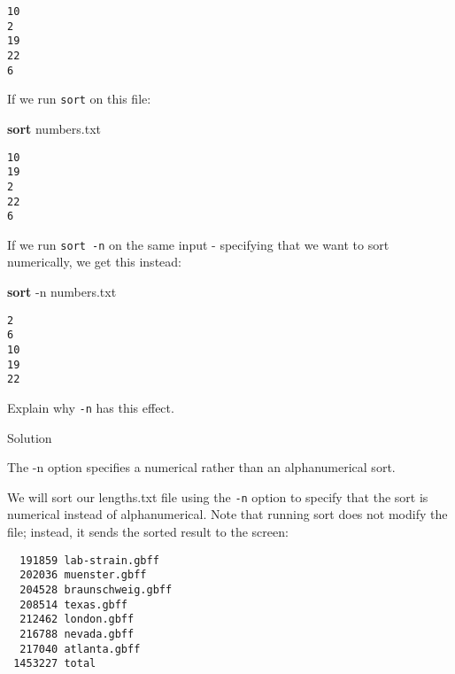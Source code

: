 \documentclass[
]{book}
\newenvironment{Shaded}{\begin{snugshade}}{\end{snugshade}}
\newcommand{\AttributeTok}[1]{\textcolor[rgb]{0.13,0.29,0.53}{#1}}
\newcommand{\BuiltInTok}[1]{#1}
\newcommand{\ExtensionTok}[1]{#1}
\newcommand{\FunctionTok}[1]{\textcolor[rgb]{0.13,0.29,0.53}{\textbf{#1}}}
\newcommand{\NormalTok}[1]{#1}
\begin{document}
\begin{verbatim}
10
2
19
22
6
\end{verbatim}

If we run \texttt{sort} on this file:

\begin{Shaded}
\begin{Highlighting}[]
\FunctionTok{sort}\NormalTok{ numbers.txt}
\end{Highlighting}
\end{Shaded}

\begin{verbatim}
10
19
2
22
6
\end{verbatim}

If we run \texttt{sort\ -n} on the same input - specifying that we want to sort numerically, we get this instead:

\begin{Shaded}
\begin{Highlighting}[]
\FunctionTok{sort} \AttributeTok{{-}n}\NormalTok{ numbers.txt}
\end{Highlighting}
\end{Shaded}

\begin{verbatim}
2
6
10
19
22
\end{verbatim}

Explain why \texttt{-n} has this effect.

Solution

The -n option specifies a numerical rather than an alphanumerical sort.

We will sort our lengths.txt file using the \texttt{-n} option to specify that the sort is numerical instead of alphanumerical. Note that running sort does not modify the file; instead, it sends the sorted result to the screen:

\begin{Shaded}
\end{Shaded}

\begin{verbatim}
  191859 lab-strain.gbff
  202036 muenster.gbff
  204528 braunschweig.gbff
  208514 texas.gbff
  212462 london.gbff
  216788 nevada.gbff
  217040 atlanta.gbff
 1453227 total
\end{verbatim}
\end{document}
